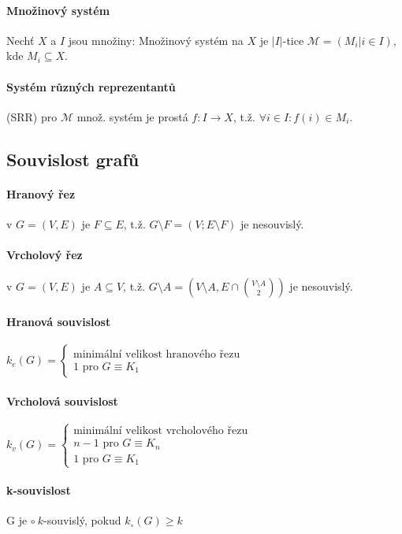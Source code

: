 \documentclass[10pt,a4paper]{article}
\theoremstyle{plain}
\begin{document}
\paragraph{Množinový systém} Nechť $X$ a $I$ jsou množiny: Množinový systém na $X$ je $|I|$-tice $\mathcal{M}=(M_i | i \in I)$, kde $M_i \subseteq X$.

\paragraph{Systém různých reprezentantů} (SRR) pro $\mathcal{M}$ množ. systém je prostá $f: I \to X$, t.ž. $\forall i \in I: f(i) \in M_i$.

\subsection{Souvislost grafů}
\paragraph{Hranový řez} v $G=(V,E)$ je $F \subseteq E$, t.ž. $G \setminus F = (V; E \setminus F)$ je nesouvislý.

\paragraph{Vrcholový řez} v   $G=(V,E)$ je $A \subseteq V$, t.ž. $G \setminus A = (V \setminus A, E \cap \binom{V \setminus A}{2})$ je nesouvislý.

\paragraph{Hranová souvislost} $k_e(G) = \begin{cases} 
\text{minimální velikost hranového řezu} \\
 1 \text{ pro } G \equiv K_1 \end{cases}$
 
\paragraph{Vrcholová souvislost} $k_v(G) = \begin{cases} 
\text{minimální velikost vrcholového řezu} \\
 n-1 \text{ pro } G \equiv K_n \\
 1 \text{ pro } G \equiv K_1 \end{cases}$
 
\paragraph{k-souvislost} G je $\circ\  k$-souvislý, pokud $k_\circ(G) \geq k$ 
 
\end{document}
